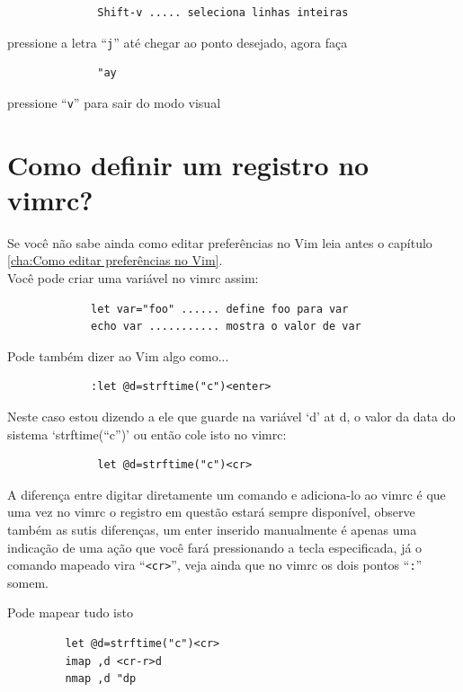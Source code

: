 \documentclass[10pt,a4paper,openany]{book}
\begin{document}
\begin{verbatim}
			  Shift-v ..... seleciona linhas inteiras
\end{verbatim}

pressione a letra ``\verb|j|'' até chegar ao ponto desejado, agora faça

\begin{verbatim}
			  "ay
\end{verbatim}

pressione ``\verb|v|'' para sair do modo visual

\section{Como definir um registro no vimrc?}
\label{Como definir um registro no vimrc?}

Se você não sabe ainda como editar preferências no Vim
leia antes o capítulo \ref{cha:Como editar preferências no Vim}. \\


Você pode criar uma variável no vimrc assim:

\begin{verbatim}
			 let var="foo" ...... define foo para var
			 echo var ........... mostra o valor de var
\end{verbatim}

Pode também dizer ao Vim algo como...

\begin{verbatim}
			 :let @d=strftime("c")<enter>
\end{verbatim}

Neste caso estou dizendo a ele que guarde na variável `d' at d,
o valor da data do sistema `strftime(``c'')' ou então cole isto no
vimrc:

\begin{verbatim}
			  let @d=strftime("c")<cr>
\end{verbatim}

A diferença entre digitar diretamente um comando e adiciona-lo ao
vimrc é que uma vez no vimrc o registro em questão estará sempre
disponível, observe também as sutis diferenças, um enter inserido
manualmente é apenas uma indicação de uma ação que você fará
pressionando a tecla especificada, já o comando mapeado vira
``\verb|<cr>|'', veja ainda que no vimrc os dois pontos ``\verb|:|''
somem.

Pode mapear tudo isto

\begin{verbatim}
		 let @d=strftime("c")<cr>
		 imap ,d <cr-r>d
		 nmap ,d "dp
\end{verbatim}
\end{document}
